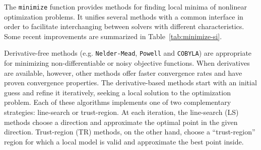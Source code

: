 The \texttt{minimize} function provides methods for finding local minima of
nonlinear optimization problems. It unifies several methods with a common 
interface in order to facilitate interchanging between solvers with different
characteristics. Some recent improvements are summarized in Table~\ref{tab:minimize-si}.

Derivative-free methods (e.g. \texttt{Nelder-Mead}, \texttt{Powell} and \texttt{COBYLA}) are appropriate for minimizing non-differentiable or
noisy objective functions. When derivatives are available, however, other methods offer faster convergence rates
and have proven convergence properties. 
The derivative-based methods start with an initial guess and refine it iteratively, seeking
a local solution to the optimization problem. Each of these algorithms implements one of two complementary strategies:
line-search or trust-region. At each iteration, the line-search (LS) methods choose a direction
and approximate the optimal point in the given direction. Trust-region (TR) methods, on the other
hand, choose a ``trust-region'' region for which a local model is valid and approximate the best point
inside.

